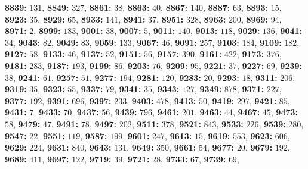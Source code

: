 \textsf{\bfseries 8839:} $131$, \textsf{\bfseries 8849:} $327$, \textsf{\bfseries 8861:} $38$, \textsf{\bfseries 8863:} $40$, \textsf{\bfseries 8867:} $140$, \textsf{\bfseries 8887:} $63$, \textsf{\bfseries 8893:} $15$, \textsf{\bfseries 8923:} $35$, \textsf{\bfseries 8929:} $65$, \textsf{\bfseries 8933:} $141$, \textsf{\bfseries 8941:} $37$, \textsf{\bfseries 8951:} $328$, \textsf{\bfseries 8963:} $200$, \textsf{\bfseries 8969:} $94$, \textsf{\bfseries 8971:} $2$, \textsf{\bfseries 8999:} $183$, \textsf{\bfseries 9001:} $38$, \textsf{\bfseries 9007:} $5$, \textsf{\bfseries 9011:} $140$, \textsf{\bfseries 9013:} $118$, \textsf{\bfseries 9029:} $136$, \textsf{\bfseries 9041:} $34$, \textsf{\bfseries 9043:} $82$, \textsf{\bfseries 9049:} $83$, \textsf{\bfseries 9059:} $133$, \textsf{\bfseries 9067:} $46$, \textsf{\bfseries 9091:} $257$, \textsf{\bfseries 9103:} $184$, \textsf{\bfseries 9109:} $182$, \textsf{\bfseries 9127:} $58$, \textsf{\bfseries 9133:} $46$, \textsf{\bfseries 9137:} $52$, \textsf{\bfseries 9151:} $56$, \textsf{\bfseries 9157:} $390$, \textsf{\bfseries 9161:} $422$, \textsf{\bfseries 9173:} $376$, \textsf{\bfseries 9181:} $283$, \textsf{\bfseries 9187:} $193$, \textsf{\bfseries 9199:} $86$, \textsf{\bfseries 9203:} $76$, \textsf{\bfseries 9209:} $95$, \textsf{\bfseries 9221:} $37$, \textsf{\bfseries 9227:} $69$, \textsf{\bfseries 9239:} $38$, \textsf{\bfseries 9241:} $61$, \textsf{\bfseries 9257:} $51$, \textsf{\bfseries 9277:} $194$, \textsf{\bfseries 9281:} $120$, \textsf{\bfseries 9283:} $20$, \textsf{\bfseries 9293:} $18$, \textsf{\bfseries 9311:} $206$, \textsf{\bfseries 9319:} $35$, \textsf{\bfseries 9323:} $55$, \textsf{\bfseries 9337:} $79$, \textsf{\bfseries 9341:} $35$, \textsf{\bfseries 9343:} $127$, \textsf{\bfseries 9349:} $878$, \textsf{\bfseries 9371:} $227$, \textsf{\bfseries 9377:} $192$, \textsf{\bfseries 9391:} $696$, \textsf{\bfseries 9397:} $233$, \textsf{\bfseries 9403:} $478$, \textsf{\bfseries 9413:} $50$, \textsf{\bfseries 9419:} $297$, \textsf{\bfseries 9421:} $85$, \textsf{\bfseries 9431:} $7$, \textsf{\bfseries 9433:} $70$, \textsf{\bfseries 9437:} $56$, \textsf{\bfseries 9439:} $796$, \textsf{\bfseries 9461:} $201$, \textsf{\bfseries 9463:} $44$, \textsf{\bfseries 9467:} $45$, \textsf{\bfseries 9473:} $58$, \textsf{\bfseries 9479:} $47$, \textsf{\bfseries 9491:} $78$, \textsf{\bfseries 9497:} $202$, \textsf{\bfseries 9511:} $378$, \textsf{\bfseries 9521:} $843$, \textsf{\bfseries 9533:} $226$, \textsf{\bfseries 9539:} $280$, \textsf{\bfseries 9547:} $22$, \textsf{\bfseries 9551:} $119$, \textsf{\bfseries 9587:} $199$, \textsf{\bfseries 9601:} $247$, \textsf{\bfseries 9613:} $15$, \textsf{\bfseries 9619:} $553$, \textsf{\bfseries 9623:} $606$, \textsf{\bfseries 9629:} $224$, \textsf{\bfseries 9631:} $840$, \textsf{\bfseries 9643:} $131$, \textsf{\bfseries 9649:} $350$, \textsf{\bfseries 9661:} $54$, \textsf{\bfseries 9677:} $20$, \textsf{\bfseries 9679:} $192$, \textsf{\bfseries 9689:} $411$, \textsf{\bfseries 9697:} $122$, \textsf{\bfseries 9719:} $39$, \textsf{\bfseries 9721:} $28$, \textsf{\bfseries 9733:} $67$, \textsf{\bfseries 9739:} $69$, 
